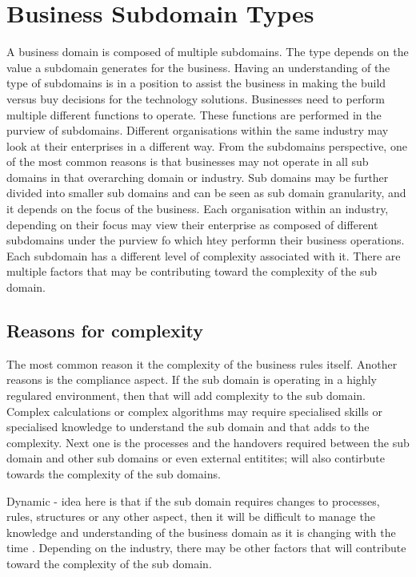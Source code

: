 \documentclass[a4paper, 11pt]{book}
\begin{document}
    \section{Business Subdomain Types}
    A business domain is composed of multiple subdomains. The type depends on the value a subdomain generates for the business.
    Having an understanding of the type of subdomains is in a position to assist the business in making the build versus buy decisions for the technology solutions.
    Businesses need to perform multiple different functions to operate.
    These functions are performed in the purview of subdomains. Different organisations within the same industry may look at their enterprises in a different way.
    From the subdomains perspective, one of the most common reasons is that businesses may not operate in all sub domains in that overarching domain or industry.
    Sub domains may be further divided into smaller sub domains and can be seen as sub domain granularity, and it depends on the focus of the business.
    Each organisation within an industry, depending on their focus may view their enterprise as composed of different subdomains under the purview fo which htey performn their business operations.
    Each subdomain has a different level of complexity associated with it.
    There are multiple factors that may be contributing toward the complexity of the sub domain.

    \subsection{Reasons for complexity}
    The most common reason it the complexity of the business rules itself.
    Another reasons is the compliance aspect. If the sub domain is operating in a highly regulared environment, then that will add complexity to the sub domain.
    Complex calculations or complex algorithms may require specialised skills or specialised knowledge to understand the sub domain and that adds to the complexity.
    Next one is the processes and the handovers required between the sub domain and other sub domains or even external entitites; will also contirbute towards the complexity of the sub domains.

    Dynamic - idea here is that if the sub domain requires changes to processes, rules, structures or any other aspect, then it will be difficult to manage the knowledge and understanding of the business domain as it is changing with the time .
    Depending on the industry, there may be other factors that will contribute toward the complexity of the sub domain.
\end{document}
